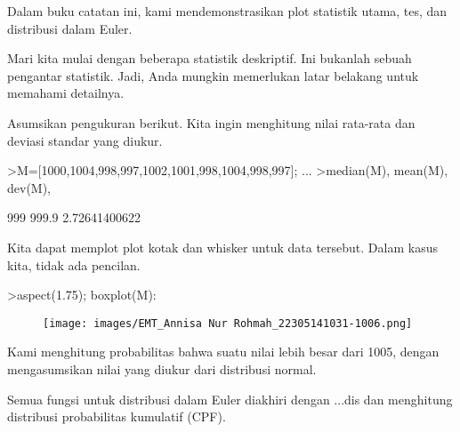 \documentclass[a4paper,10pt]{article}
\begin{document}
\begin{eulernotebook}
\begin{eulercomment}
\begin{eulercomment}
\begin{eulercomment}
\begin{eulercomment}
\begin{eulercomment}
\end{eulercomment}
\eulersubheading{}
\eulersubheading{}
\eulersubheading{}
\begin{eulercomment}



\end{eulercomment}
\begin{eulercomment}
Dalam buku catatan ini, kami mendemonstrasikan plot statistik utama,
tes, dan distribusi dalam Euler.

Mari kita mulai dengan beberapa statistik deskriptif. Ini bukanlah
sebuah pengantar statistik. Jadi, Anda mungkin memerlukan latar
belakang untuk memahami detailnya.

Asumsikan pengukuran berikut. Kita ingin menghitung nilai rata-rata
dan deviasi standar yang diukur.
\end{eulercomment}
\begin{eulerprompt}
>M=[1000,1004,998,997,1002,1001,998,1004,998,997]; ...
>median(M), mean(M), dev(M),
\end{eulerprompt}
\begin{euleroutput}
  999
  999.9
  2.72641400622
\end{euleroutput}
\begin{eulercomment}
Kita dapat memplot plot kotak dan whisker untuk data tersebut. Dalam
kasus kita, tidak ada pencilan. 
\end{eulercomment}
\begin{eulerprompt}
>aspect(1.75); boxplot(M):
\end{eulerprompt}
\begin{figure}[h]
    \centering
    \texttt{[image: images/EMT\_Annisa Nur Rohmah\_22305141031-1006.png]}
\end{figure}
\begin{eulercomment}
Kami menghitung probabilitas bahwa suatu nilai lebih besar dari 1005,
dengan mengasumsikan nilai yang diukur dari distribusi normal.

Semua fungsi untuk distribusi dalam Euler diakhiri dengan ...dis dan
menghitung distribusi probabilitas kumulatif (CPF).


\end{eulercomment}
\end{eulercomment}
\end{eulercomment}
\end{eulercomment}
\end{eulercomment}
\end{eulernotebook}
\end{document}
